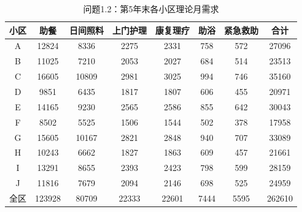 \begin{table}[h]
\centering
\caption{问题1.2：第5年末各小区理论月需求}
\begin{tabular}{|c|c|c|c|c|c|c|c|}
\hline
小区 & 助餐 & 日间照料 & 上门护理 & 康复理疗 & 助浴 & 紧急救助 & 合计 \\
\hline
A & 12824 & 8336 & 2275 & 2331 & 758 & 572 & 27096 \\
B & 11025 & 7210 & 2053 & 2027 & 684 & 514 & 23513 \\
C & 16605 & 10809 & 2981 & 3025 & 994 & 746 & 35160 \\
D & 9851 & 6435 & 1817 & 1807 & 606 & 455 & 20971 \\
E & 14165 & 9230 & 2565 & 2586 & 855 & 642 & 30043 \\
F & 8502 & 5525 & 1506 & 1544 & 502 & 378 & 17958 \\
G & 15605 & 10167 & 2821 & 2848 & 940 & 707 & 33089 \\
H & 10243 & 6662 & 1827 & 1863 & 609 & 457 & 21661 \\
I & 13291 & 8655 & 2393 & 2423 & 798 & 599 & 28159 \\
J & 11816 & 7679 & 2094 & 2146 & 698 & 525 & 24959 \\
全区 & 123928 & 80709 & 22333 & 22601 & 7444 & 5595 & 262610 \\
\hline
\end{tabular}
\end{table}
